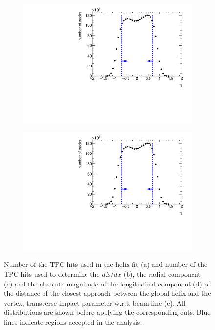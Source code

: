\begin{figure}[b!]
\begin{subfigure}{.45\textwidth}
		\caption{}
	\end{subfigure}
	\begin{subfigure}{.45\textwidth}
		\includegraphics[width=\textwidth, page=4]{chapters/chrgSTAR/img/selection/SDT.pdf}
		\caption{}
	\end{subfigure}
	\begin{subfigure}{.45\textwidth}
		\includegraphics[width=\textwidth, page=9]{chapters/chrgSTAR/img/selection/SDT.pdf}
		\caption{}
	\end{subfigure}
	\begin{minipage}{.45\textwidth}
		
		
		\caption{Number of the  TPC hits used in the helix fit (a) and number of the  TPC hits used to determine the $dE/dx$ (b), the radial component (c) and the absolute magnitude of the longitudinal component (d) of the distance of the closest approach between  the global helix and the vertex, transverse impact parameter w.r.t. beam-line (e). All distributions are shown before applying  the corresponding cuts. Blue lines indicate regions accepted in the analysis.}
		\label{fig:dca_nhitsSTAR}
	\end{minipage}
\end{figure}

